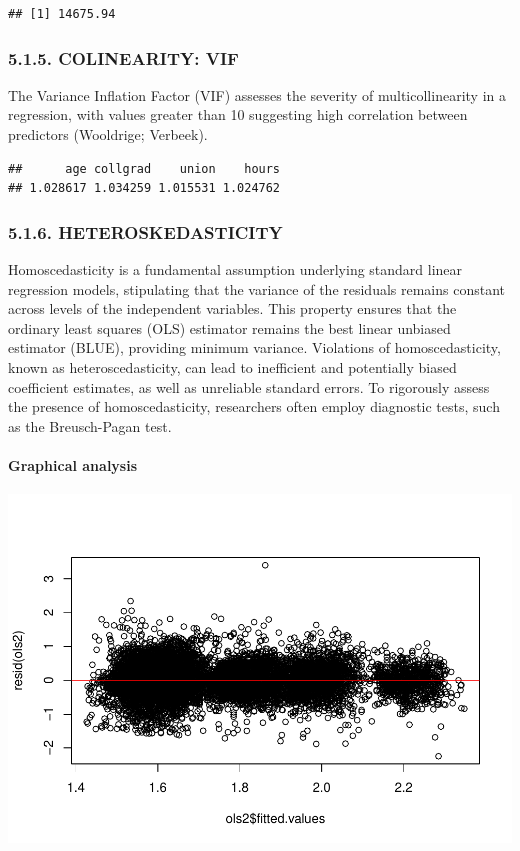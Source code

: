\documentclass[
]{article}
\begin{document}
\begin{verbatim}
## [1] 14675.94
\end{verbatim}

\subsubsection{5.1.5. COLINEARITY: VIF}\label{colinearity-vif}

The Variance Inflation Factor (VIF) assesses the severity of
multicollinearity in a regression, with values greater than 10
suggesting high correlation between predictors (Wooldrige; Verbeek).

\begin{verbatim}
##      age collgrad    union    hours 
## 1.028617 1.034259 1.015531 1.024762
\end{verbatim}

\subsubsection{5.1.6. HETEROSKEDASTICITY}\label{heteroskedasticity}

Homoscedasticity is a fundamental assumption underlying standard linear
regression models, stipulating that the variance of the residuals
remains constant across levels of the independent variables. This
property ensures that the ordinary least squares (OLS) estimator remains
the best linear unbiased estimator (BLUE), providing minimum variance.
Violations of homoscedasticity, known as heteroscedasticity, can lead to
inefficient and potentially biased coefficient estimates, as well as
unreliable standard errors. To rigorously assess the presence of
homoscedasticity, researchers often employ diagnostic tests, such as the
Breusch-Pagan test.

\paragraph{Graphical analysis}\label{graphical-analysis}

\includegraphics{Rintro2_files/figure-latex/unnamed-chunk-11-1.pdf}
\end{document}
